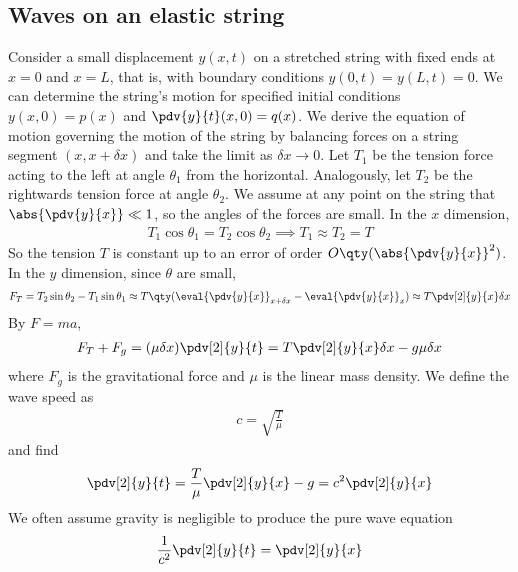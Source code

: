 \subsection{Waves on an elastic string}
Consider a small displacement $y(x,t)$ on a stretched string with fixed ends at $x = 0$ and $x = L$, that is, with boundary conditions $y(0,t) = y(L,t) = 0$.
We can determine the string's motion for specified initial conditions $y(x,0) = p(x)$ and $\pdv{y}{t}(x,0) = q(x)$.
We derive the equation of motion governing the motion of the string by balancing forces on a string segment $(x,x+\delta x)$ and take the limit as $\delta x \to 0$.
Let $T_1$ be the tension force acting to the left at angle $\theta_1$ from the horizontal.
Analogously, let $T_2$ be the rightwards tension force at angle $\theta_2$.
We assume at any point on the string that $\abs{\pdv{y}{x}} \ll 1$, so the angles of the forces are small.
In the $x$ dimension,
\begin{align*}
    T_1 \cos \theta_1 = T_2 \cos \theta_2 \implies T_1 \approx T_2 = T
\end{align*}
So the tension $T$ is constant up to an error of order $O\qty(\abs{\pdv{y}{x}
}^2)$.
In the $y$ dimension, since $\theta$ are small,
\begin{align*}
    F_T = T_2 \sin \theta_2 - T_1 \sin \theta_1 \approx T \qty(\eval{\pdv{y}{x}}_{x + \delta x} - \eval{\pdv{y}{x}}_x) \approx T \pdv[2]{y}{x} \delta x
\end{align*}
By $F = ma$,
\begin{align*}
    F_T + F_g = (\mu \delta x) \pdv[2]{y}{t} = T \pdv[2]{y}{x} \delta x - g \mu \delta x
\end{align*}
where $F_g$ is the gravitational force and $\mu$ is the linear mass density.
We define the wave speed as
\begin{align*}
    c = \sqrt{\frac{T}{\mu}}
\end{align*}
and find
\begin{align*}
    \pdv[2]{y}{t} = \frac{T}{\mu} \pdv[2]{y}{x} - g = c^2 \pdv[2]{y}{x}
\end{align*}
We often assume gravity is negligible to produce the pure wave equation
\begin{align*}
    \frac{1}{c^2} \pdv[2]{y}{t} = \pdv[2]{y}{x}
\end{align*}